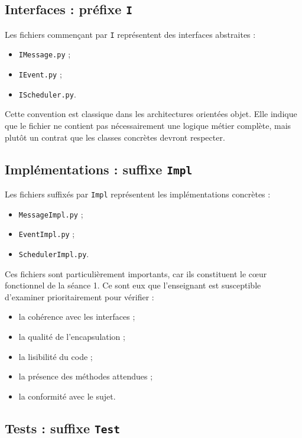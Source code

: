 \documentclass{article}
\begin{document}
\subsection{Interfaces : préfixe \texttt{I}}

Les fichiers commençant par \texttt{I} représentent des interfaces abstraites :
\begin{itemize}[leftmargin=*]
    \item \texttt{IMessage.py} ;
    \item \texttt{IEvent.py} ;
    \item \texttt{IScheduler.py}.
\end{itemize}

Cette convention est classique dans les architectures orientées objet. Elle indique que le fichier ne contient pas nécessairement une logique métier complète, mais plutôt un contrat que les classes concrètes devront respecter.

\subsection{Implémentations : suffixe \texttt{Impl}}

Les fichiers suffixés par \texttt{Impl} représentent les implémentations concrètes :
\begin{itemize}[leftmargin=*]
    \item \texttt{MessageImpl.py} ;
    \item \texttt{EventImpl.py} ;
    \item \texttt{SchedulerImpl.py}.
\end{itemize}

Ces fichiers sont particulièrement importants, car ils constituent le cœur fonctionnel de la séance 1. Ce sont eux que l’enseignant est susceptible d’examiner prioritairement pour vérifier :
\begin{itemize}[leftmargin=*]
    \item la cohérence avec les interfaces ;
    \item la qualité de l’encapsulation ;
    \item la lisibilité du code ;
    \item la présence des méthodes attendues ;
    \item la conformité avec le sujet.
\end{itemize}

\subsection{Tests : suffixe \texttt{Test}}
\end{document}
